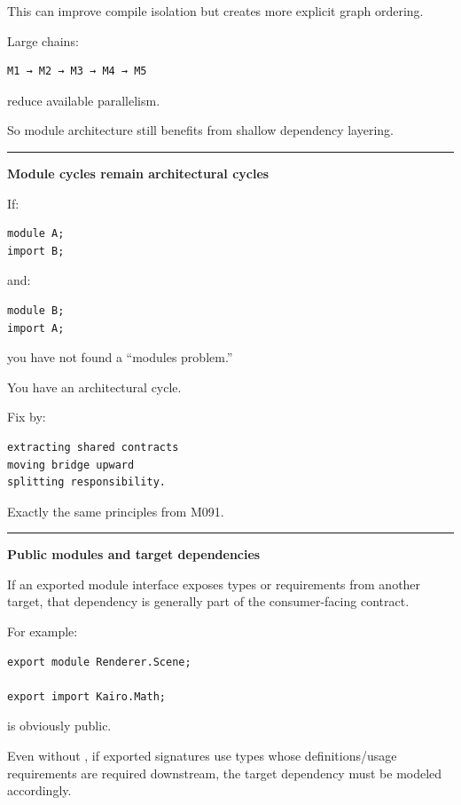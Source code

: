 This can improve compile isolation but creates more explicit graph ordering.

Large chains:

\begin{verbatim}
M1 → M2 → M3 → M4 → M5
\end{verbatim}

reduce available parallelism.

So module architecture still benefits from shallow dependency layering.

\begin{center}\rule{0.5\linewidth}{0.5pt}\end{center}

\textbf{Module cycles remain architectural cycles}

If:

\begin{verbatim}
module A;
import B;
\end{verbatim}

and:

\begin{verbatim}
module B;
import A;
\end{verbatim}

you have not found a ``modules problem.''

You have an architectural cycle.

Fix by:

\begin{verbatim}
extracting shared contracts
moving bridge upward
splitting responsibility.
\end{verbatim}

Exactly the same principles from M091.

\begin{center}\rule{0.5\linewidth}{0.5pt}\end{center}

\textbf{Public modules and target dependencies}

If an exported module interface exposes types or requirements from another target, that dependency is generally part of the consumer-facing contract.

For example:

\begin{verbatim}
export module Renderer.Scene;

export import Kairo.Math;
\end{verbatim}

is obviously public.

Even without , if exported signatures use types whose definitions/usage requirements are required downstream, the target dependency must be modeled accordingly.

